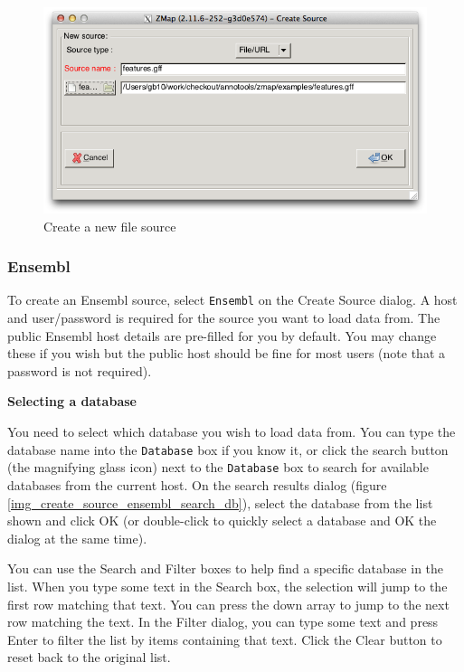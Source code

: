 \documentclass[letterpaper]{article}
\begin{document}
\begin{figure}
\centering
\color[rgb]{0.30980393,0.5058824,0.7411765}
\includegraphics[resolution=150]{images/create_source_file.png}
\caption{Create a new file source}
\label{img_create_source_file}
\end{figure}

\subsubsection{Ensembl}
\label{sec_ensembl}
To create an Ensembl source, select \lstinline{Ensembl} on the Create Source dialog. A host and user/password is required for the source you want to load data from. The public Ensembl host details are pre-filled for you by default. You may change these if you wish but the public host should be fine for most users (note that a password is not required).

\textbf{Selecting a database}
\label{sec_ensembl_select_database}

You need to select which database you wish to load data from. You can type the database name into the \lstinline{Database} box if you know it, or click the search button (the magnifying glass icon) next to the \lstinline{Database} box to search for available databases from the current host. On the search results dialog (figure \ref{img_create_source_ensembl_search_db}), select the database from the list shown and click OK (or double-click to quickly select a database and OK the dialog at the same time).

You can use the Search and Filter boxes to help find a specific database in the list. When you type some text in the Search box, the selection will jump to the first row matching that text. You can press the down array to jump to the next row matching the text. In the Filter dialog, you can type some text and press Enter to filter the list by items containing that text. Click the Clear button to reset back to the original list.
\end{document}
